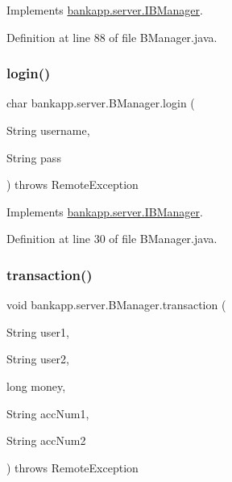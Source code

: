 Implements \hyperlink{interfacebankapp_1_1server_1_1_i_b_manager_a7b1a8e3d663126a894a7c074f35e49d3}{bankapp.\+server.\+I\+B\+Manager}.



Definition at line 88 of file B\+Manager.\+java.

\mbox{\label{classbankapp_1_1server_1_1_b_manager_a3840891c318887cef8ed2f7c193cfba9}} 
\subsubsection{\texorpdfstring{login()}{login()}}
{\footnotesize\ttfamily char bankapp.\+server.\+B\+Manager.\+login (\begin{DoxyParamCaption}\item[{String}]{username,  }\item[{String}]{pass }\end{DoxyParamCaption}) throws Remote\+Exception}



Implements \hyperlink{interfacebankapp_1_1server_1_1_i_b_manager_a96bce16e21db1585eb42a5ef55b43050}{bankapp.\+server.\+I\+B\+Manager}.



Definition at line 30 of file B\+Manager.\+java.

\mbox{\label{classbankapp_1_1server_1_1_b_manager_a5ce24fa69bd4bd08ef793072495b84b4}} 
\subsubsection{\texorpdfstring{transaction()}{transaction()}}
{\footnotesize\ttfamily void bankapp.\+server.\+B\+Manager.\+transaction (\begin{DoxyParamCaption}\item[{String}]{user1,  }\item[{String}]{user2,  }\item[{long}]{money,  }\item[{String}]{acc\+Num1,  }\item[{String}]{acc\+Num2 }\end{DoxyParamCaption}) throws Remote\+Exception}



